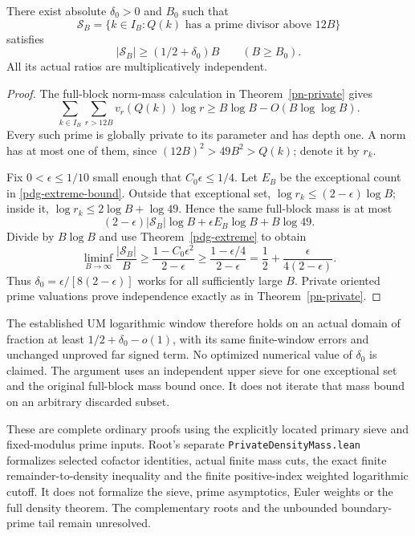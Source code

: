 \begin{theorem}
\label{pdg-domain}
There exist absolute \(\delta_0>0\) and \(B_0\) such that
\[
 \mathcal S_B=\{k\in I_B:Q(k)\text{ has a prime divisor above }12B\}
\]
satisfies
\[
 |\mathcal S_B|\geq(1/2+\delta_0)B\qquad(B\geq B_0).
\]
All its actual ratios are multiplicatively independent.
\end{theorem}
\begin{proof}
The full-block norm-mass calculation in Theorem~\ref{pn-private}
gives
\[
 \sum_{k\in I_B}\sum_{r>12B}v_r(Q(k))\log r
       \geq B\log B-O(B\log\log B).
\]
Every such prime is globally private to its parameter and has
depth one. A norm has at most one of them, since
\((12B)^2>49B^2>Q(k)\); denote it by \(r_k\).

Fix \(0<\epsilon\leq1/10\) small enough that \(C_0\epsilon\leq1/4\).
Let \(E_B\) be the exceptional count in \eqref{pdg-extreme-bound}.
Outside that exceptional set, \(\log r_k\leq(2-\epsilon)\log B\);
inside it, \(\log r_k\leq2\log B+\log49\). Hence the same full-block
mass is at most
\[
 (2-\epsilon)|\mathcal S_B|\log B+
               \epsilon E_B\log B+B\log49.
\]
Divide by \(B\log B\) and use Theorem~\ref{pdg-extreme} to obtain
\[
 \liminf_{B\to\infty}\frac{|\mathcal S_B|}{B}
 \geq\frac{1-C_0\epsilon^2}{2-\epsilon}
 \geq\frac{1-\epsilon/4}{2-\epsilon}
 =\frac12+\frac{\epsilon}{4(2-\epsilon)}.
\]
Thus \(\delta_0=\epsilon/[8(2-\epsilon)]\) works for all sufficiently
large \(B\). Private oriented prime valuations prove independence
exactly as in Theorem~\ref{pn-private}.
\end{proof}

The established UM logarithmic window therefore holds on an actual
domain of fraction at least \(1/2+\delta_0-o(1)\), with its same
finite-window errors and unchanged unproved far signed term.
No optimized numerical value of \(\delta_0\) is claimed.
The argument uses an independent upper sieve for one exceptional set
and the original full-block mass bound once. It does not iterate
that mass bound on an arbitrary discarded subset.

These are complete ordinary proofs using the explicitly located
primary sieve and fixed-modulus prime inputs. Root's separate
\texttt{Private\allowbreak Density\allowbreak Mass.lean} formalizes
selected cofactor identities, actual finite mass cuts, the exact
finite remainder-to-density inequality and the finite positive-index
weighted logarithmic cutoff. It does not formalize the sieve,
prime asymptotics, Euler weights or the full density theorem.
The complementary roots and the unbounded boundary-prime tail
remain unresolved.
